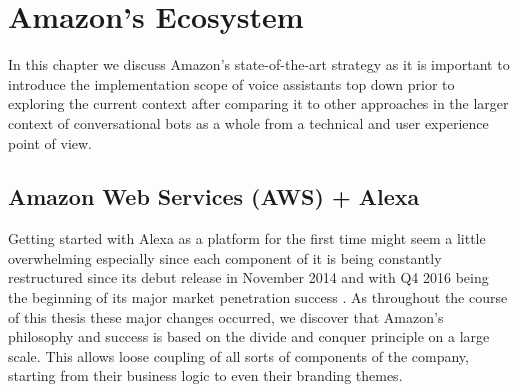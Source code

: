 
















\chapter{Amazon's Ecosystem}
\label{amznecosys}





In this chapter we discuss Amazon's state-of-the-art strategy
as it is important to introduce the implementation scope of voice assistants 
top down
prior to exploring the current context 
after comparing it to other approaches in the larger context of conversational bots as a whole from a technical and user experience point of view. 


\section[Amazon Web Services + Alexa]{Amazon Web Services (AWS) + Alexa}


Getting started with Alexa as a platform for the first time might seem a little overwhelming especially since each component of it is being  constantly restructured since its debut release in November 2014 and with Q4 2016 being the beginning of its major market penetration success \cite{gartnerpreds17}. %
As throughout the course of this thesis these major changes occurred, we discover that Amazon's philosophy and success is based on the divide and conquer principle on  a large scale. This allows loose coupling of all sorts of components of the company, starting from their business logic to even their branding themes. %
 

